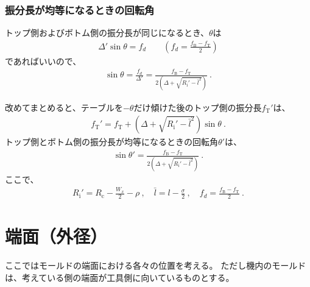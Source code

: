 \subsection{振分長が均等になるときの回転角}
トップ側およびボトム側の振分長が同じになるとき、$\theta$は
\begin{align*}
  \varDelta'\sin\theta = f_d \qquad \left(f_d = \frac{f_\mathrm B-f_\mathrm T}2\right)
\end{align*}
であればいいので、
\begin{align*}
  \sin\theta = \frac{f_d}{\varDelta'}
  = \frac{f_\mathrm B-f_\mathrm T}{2\left(\varDelta+\sqrt{R_\mathrm i'-\bar l^2}\right)}~.
\end{align*}
\begin{hosoku}
改めてまとめると、テーブルを$-\theta$だけ傾けた後のトップ側の振分長$f_\mathrm T'$は、
\begin{align*}
  f_\mathrm T' = f_\mathrm T+\left(\varDelta+\sqrt{R_\mathrm i'-\bar l^2}\right)\!\sin\theta\ .
\end{align*}
トップ側とボトム側の振分長が均等になるときの回転角$\theta'$は、
\begin{align*}
  \sin\theta' = \frac{f_\mathrm B-f_\mathrm T}{2\left(\varDelta+\sqrt{R_\mathrm i'-\bar l^2}\right)}\ .
\end{align*}
ここで、
\begin{align*}
  R_\mathrm i' = R_\mathrm c-\frac{W_x}2-\rho\ ,\quad
  \bar l = l-\frac\sigma2\ ,\quad
  f_d = \frac{f_\mathrm B-f_\mathrm T}2\ .
\end{align*}
\end{hosoku}




\chapter{端面（外径）}
ここではモールドの端面における各々の位置を考える。
ただし機内のモールドは、考えている側の端面が工具側に向いているものとする。




